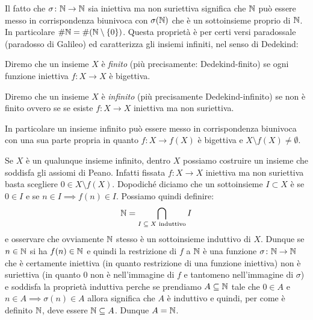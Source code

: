 Il fatto che $\sigma\colon {\mathbb N}\to {\mathbb N}$ sia iniettiva ma non suriettiva 
significa che ${\mathbb N}$ può essere messo in corrispondenza biunivoca con $\sigma({\mathbb N})$ 
che è un sottoinsieme proprio di ${\mathbb N}$.
In particolare $\#{\mathbb N} = \#{\left( {\mathbb N} \setminus{\left\{ 0 \right\}} \right)}$.
Questa proprietà è per certi versi paradossale
(paradosso di Galileo)
%
%
ed caratterizza gli 
insiemi infiniti, nel senso di Dedekind:

\begin{definition}
  \label{def:infinito}%
  Diremo che un insieme $X$ è \emph{finito}
  (più precisamente: Dedekind-finito)
  se ogni funzione iniettiva $f\colon X\to X$ è bigettiva.

  Diremo che un insieme $X$ è \emph{infinito} 
  (più precisamente Dedekind-infinito)
  se non è finito ovvero se
  se esiste $f\colon X\to X$ iniettiva ma non suriettiva.
\end{definition}

In particolare un insieme infinito 
può essere messo in corrispondenza biunivoca
con una sua parte propria 
in quanto $f\colon X \to f(X)$ è bigettiva
e $X\setminus f(X)\neq \emptyset$.

Se $X$ è un qualunque insieme infinito, dentro $X$ 
possiamo costruire un insieme che soddisfa gli assiomi di Peano.
Infatti fissata $f\colon X\to X$ iniettiva ma non suriettiva 
basta scegliere $0\in X\setminus f(X)$. 
Dopodiché diciamo che un sottoinsieme $I\subset X$ è 
se $0\in I$ e se $n\in I\implies f(n)\in I$. Possiamo quindi definire:
\[
  {\mathbb N} = \bigcap_{\text{$I\subseteq X$ induttivo}} I
\]
e osservare che ovviamente ${\mathbb N}$ stesso è un sottoinsieme induttivo di $X$.
Dunque se $n\in {\mathbb N}$ si ha $f(n)\in {\mathbb N}$ e quindi la 
restrizione di $f$ a ${\mathbb N}$ è una funzione $\sigma\colon {\mathbb N}\to{\mathbb N}$ 
che è certamente iniettiva (in quanto restrizione di una funzione iniettiva)
non è suriettiva (in quanto $0$ non è nell'immagine di $f$ 
e tantomeno nell'immagine di $\sigma$) e soddisfa la proprietà induttiva 
perche se prendiamo $A\subseteq {\mathbb N}$ tale che $0\in A$ e $n\in A \implies \sigma(n) \in A$ 
allora significa che $A$ è induttivo e quindi, per come è definito ${\mathbb N}$,
deve essere ${\mathbb N}\subseteq A$. Dunque $A={\mathbb N}$.

